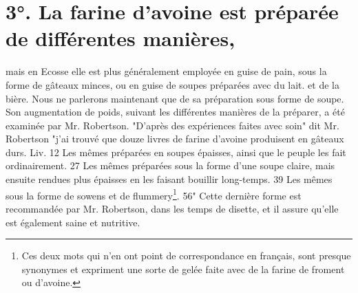 \section{3°. La farine d'avoine est préparée de différentes manières,} mais en Ecosse elle est plus généralement employée en guise de pain, sous la forme de gâteaux minces, ou en guise de soupes préparées avec du lait.\setcounter{page}{354} et de la bière. Nous ne parlerons maintenant que de sa préparation sous forme de soupe. Son augmentation de poids, suivant les différentes manières de la préparer, a été examinée par Mr. Robertson. "D'après des expériences faites avec soin" dit Mr. Robertson "j'ai trouvé que douze livres de farine d'avoine produisent en gâteaux durs. Liv. 12
Les mêmes préparées en soupes épaisses, ainsi que le peuple les fait ordinairement. 27
Les mêmes préparées sous la forme d'une soupe claire, mais ensuite rendues plus épaisses en les faisant bouillir long-temps. 39
Les mêmes sous la forme de sowens et de flummery\footnote{Ces deux mots qui n'en ont point de correspondance en français, sont presque synonymes et expriment une sorte de gelée faite avec de la farine de froment ou d'avoine.}. 56"
Cette dernière forme est recommandée par Mr. Robertson, dans les temps de disette, et il assure qu'elle est également saine et nutritive.
